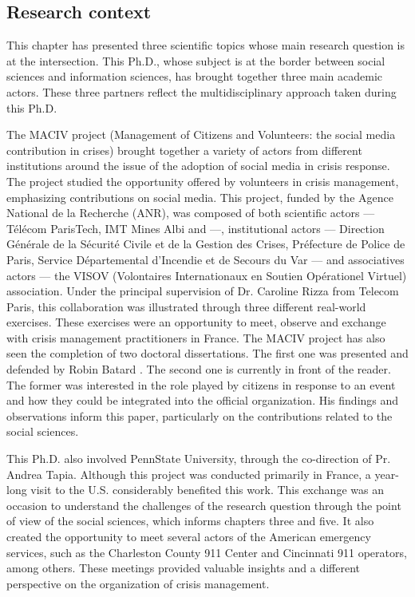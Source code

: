 \subsection{Research context}
This chapter has presented three scientific topics whose main research question is at the intersection.
This Ph.D., whose subject is at the border between social sciences and information sciences, has brought together three main academic actors.
These three partners reflect the multidisciplinary approach taken during this Ph.D.

The MACIV project (Management of Citizens and Volunteers: the social media contribution in crises) brought together a variety of actors from different institutions around the issue of the adoption of social media in crisis response.
The project studied the opportunity offered by volunteers in crisis management, emphasizing contributions on social media.
This project, funded by the Agence National de la Recherche (ANR), was composed of both
scientific actors — Télécom ParisTech, IMT Mines Albi and —,
institutional actors — Direction Générale de la Sécurité Civile et de la Gestion des Crises, Préfecture de Police de Paris, Service Départemental d'Incendie et de Secours du Var — and
associatives actors — the VISOV (Volontaires Internationaux en Soutien Opérationel Virtuel) association.
Under the principal supervision of Dr. Caroline Rizza from Telecom Paris, this collaboration was illustrated through three different real-world exercises.
These exercises were an opportunity to meet, observe and exchange with crisis management practitioners in France.
The MACIV project has also seen the completion of two doctoral dissertations.
The first one was presented and defended by Robin Batard \parencite{batardIntegrerContributionsCitoyennes2021}.
The second one is currently in front of the reader.
The former was interested in the role played by citizens in response to an event and how they could be integrated into the official organization.
His findings and observations inform this paper, particularly on the contributions related to the social sciences.

This Ph.D. also involved PennState University, through the co-direction of Pr. Andrea Tapia.
Although this project was conducted primarily in France, a year-long visit to the U.S. considerably benefited this work.
This exchange was an occasion to understand the challenges of the research question through the point of view of the social sciences, which informs chapters three and five.
It also created the opportunity to meet several actors of the American emergency services, such as the Charleston County 911 Center and Cincinnati 911 operators, among others.
These meetings provided valuable insights and a different perspective on the organization of crisis management.

